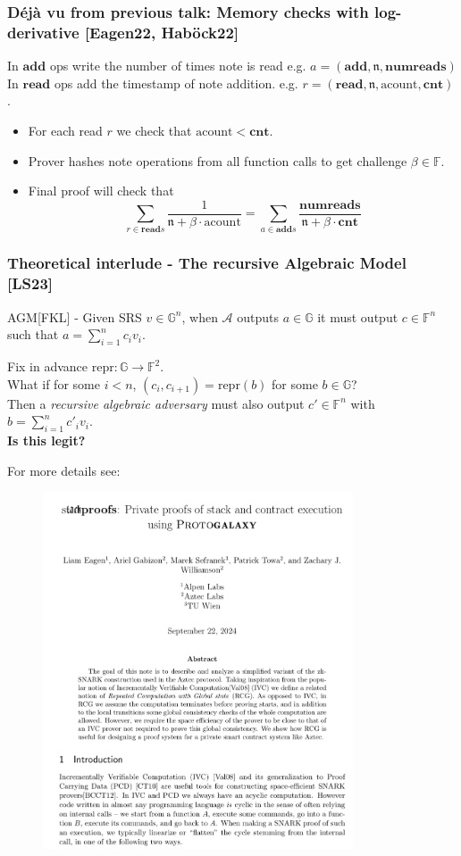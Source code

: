 \documentclass[shadesubsections,compress,14pt,mathserif]{beamer}
\newcommand{\adv}{\ensuremath{\mathcal A}}
\newcommand{\F}{\ensuremath{{\mathbb F}}}
\newcommand{\G}{\ensuremath{{\mathbb G}}}
\newcommand{\nl}{\\ \pause \vspace{0.2in}}
\newcommand{\repr}{\ensuremath{\mathrm{repr} }}
\newcommand{\numreads}{\ensuremath{\mathbf{numreads} }}
\newcommand{\add}{\ensuremath{\mathbf{add} }}
\newcommand{\adds}{\ensuremath{\mathbf{add}s }}
\newcommand{\cnt}{\ensuremath{\mathbf{cnt} }}
\newcommand{\addcount}{\ensuremath{\mathrm{acount} }}
\renewcommand{\read}{\ensuremath{\mathbf{read} }}
\newcommand{\reads}{\ensuremath{\mathbf{read}s }}
\renewcommand{\note}{\ensuremath{\mathfrak{n} }}
\begin{document}
\begin{frame}
\frametitle{ D\'ej\`a vu from previous talk: Memory checks with log-derivative {\small [Eagen22, Hab{\"{o}}ck22]}}
In $\add$ ops write the number of times note is read
e.g. $a=(\add,\note,\numreads)$\nl
In $\read$ ops add the timestamp of note addition.
e.g. $r=(\read,\note,\addcount,\cnt)$.\nl

\begin{itemize}
 \item For each read $r$ we check that $\addcount<\cnt$.\pause
 \item Prover hashes note operations from all function calls to get challenge $\beta\in \F$.\pause
 \item Final proof will check that
 \[\sum_{r\in \reads} \frac{1}{\note + \beta \cdot \addcount} = \sum _{a\in \adds}\frac{\numreads}{\note+\beta \cdot \cnt} \]
\end{itemize}

\end{frame}
\begin{frame}
 \frametitle{Theoretical interlude - The recursive Algebraic Model {\small [LS23]}}
 AGM[FKL] - Given SRS $v\in \G^n$,
 when $\adv$ outputs $a\in \G$ it must output
 $c\in \F^n$ such that $a=\sum_{i=1}^n c_i v_i$.\nl
 
 Fix in advance $\repr:\G\to \F^2$.\nl 
 What if for some $i<n$, $(c_i,c_{i+1}) = \repr(b)$ for some $b\in \G$?\\ \pause
 Then a \emph{recursive algebraic adversary} must also output $c'\in \F^n$ with
 $b=\sum_{i=1}^n c'_i v_i$.\nl
 \textbf{Is this legit?}
\end{frame}

\begin{frame}

 For more details see:
 \begin{figure}
  \includegraphics[width=260pt]{stackproofs.png}
\end{figure}
\end{frame}
% 
\end{document}
